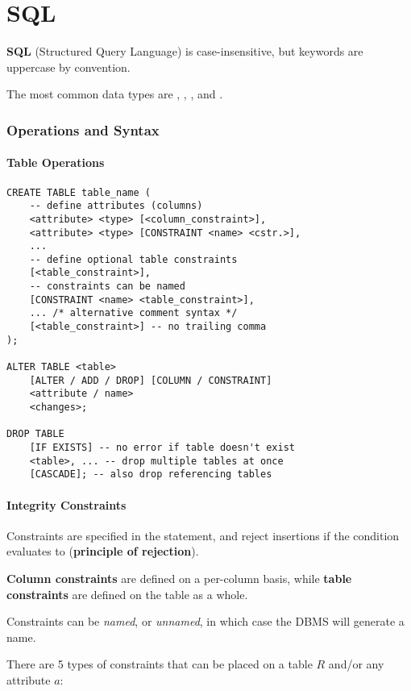 \part{SQL}
\textbf{SQL} (Structured Query Language) is case-insensitive, but keywords are uppercase by convention.

The most common data types are , , , and .

\section{Operations and Syntax}

\subsection{Table Operations}
\begin{lstlisting}
CREATE TABLE table_name (
    -- define attributes (columns)
    <attribute> <type> [<column_constraint>],
    <attribute> <type> [CONSTRAINT <name> <cstr.>],
    ...
    -- define optional table constraints
    [<table_constraint>],
    -- constraints can be named
    [CONSTRAINT <name> <table_constraint>],
    ... /* alternative comment syntax */
    [<table_constraint>] -- no trailing comma
);

ALTER TABLE <table>
    [ALTER / ADD / DROP] [COLUMN / CONSTRAINT]
    <attribute / name>
    <changes>;

DROP TABLE
    [IF EXISTS] -- no error if table doesn't exist
    <table>, ... -- drop multiple tables at once
    [CASCADE]; -- also drop referencing tables
\end{lstlisting}

\subsection{Integrity Constraints}
Constraints are specified in the  statement,
and reject insertions if the condition evaluates to  (\textbf{principle of rejection}).

\textbf{Column constraints} are defined on a per-column basis, while \textbf{table constraints} are defined on the table as a whole.

Constraints can be \textit{named}, or \textit{unnamed}, in which case the DBMS will generate a name.

There are 5 types of constraints that can be placed on a table $R$ and/or any attribute $a$:
\begin{enumerate*}
\end{enumerate*}

